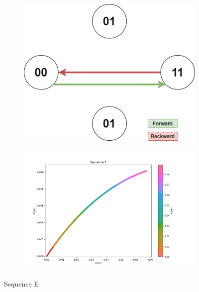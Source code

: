         \begin{figure}[h]
            \begin{subfigure}{.3\textwidth}
            \includegraphics[width=\textwidth]{images/Sequences-Sequence E.png}
            \end{subfigure}%
            \begin{subfigure}{.7\textwidth}
            \includegraphics[width=\textwidth]{images/E.png}
            \end{subfigure}
            \caption{Sequence E}
        \end{figure}
